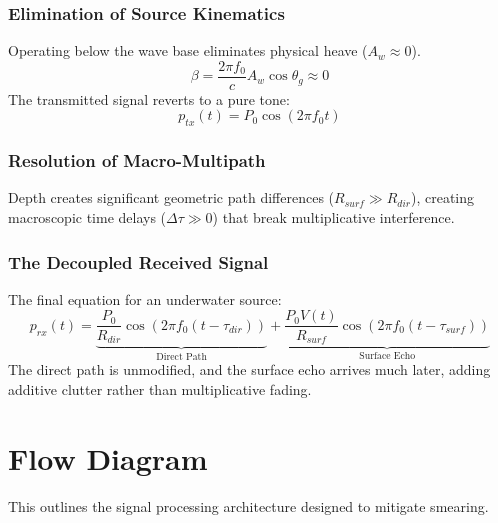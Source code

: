 \documentclass{article}
\begin{document}
\subsubsection{Elimination of Source Kinematics}
Operating below the wave base eliminates physical heave ($A_w \approx 0$).
\begin{equation}
\beta = \frac{2\pi f_0}{c} A_w \cos\theta_g \approx 0
\end{equation}
The transmitted signal reverts to a pure tone:
\begin{equation}
p_{tx}(t) = P_0 \cos(2\pi f_0 t)
\end{equation}

\subsubsection{Resolution of Macro-Multipath}
Depth creates significant geometric path differences ($R_{surf} \gg R_{dir}$), creating macroscopic time delays ($\Delta \tau \gg 0$) that break multiplicative interference.

\subsubsection{The Decoupled Received Signal}
The final equation for an underwater source:
\begin{equation}
p_{rx}(t) = \underbrace{ \frac{P_0}{R_{dir}} \cos(2\pi f_0 (t - \tau_{dir})) }_{\text{Direct Path}} + \underbrace{ \frac{P_0 V(t)}{R_{surf}} \cos(2\pi f_0 (t - \tau_{surf})) }_{\text{Surface Echo}}
\end{equation}
The direct path is unmodified, and the surface echo arrives much later, adding additive clutter rather than multiplicative fading.

\clearpage
\section{Flow Diagram}
This outlines the signal processing architecture designed to mitigate smearing.
\end{document}
